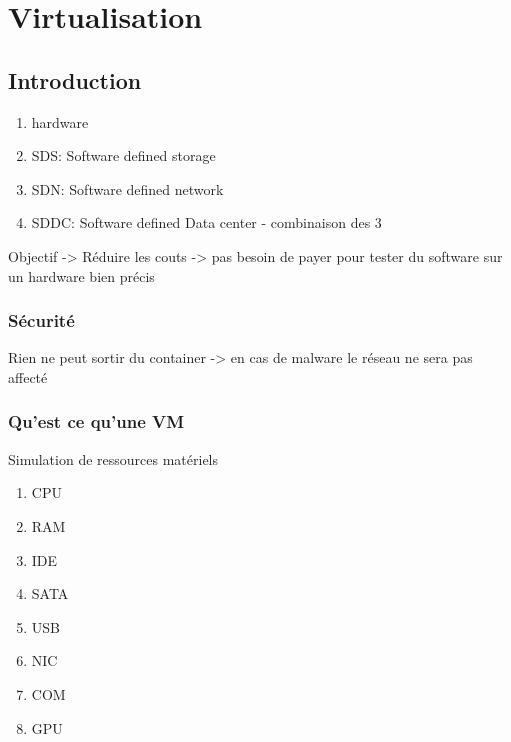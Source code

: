 \chapter{Virtualisation}
\section{Introduction}
\begin{enumerate}
\item hardware
\item SDS: Software defined storage
\item SDN: Software defined network
\item SDDC: Software defined Data center - combinaison des 3
\end{enumerate}
Objectif -> Réduire les couts -> pas besoin de payer pour tester du software sur un hardware bien précis

\subsection{Sécurité}
Rien ne peut sortir du container -> en cas de malware le réseau ne sera pas affecté

\subsection{Qu'est ce qu'une VM}
Simulation de ressources matériels
\begin{enumerate}
\item CPU
\item RAM
\item IDE
\item SATA
\item USB
\item NIC
\item COM
\item GPU
\end{enumerate}
